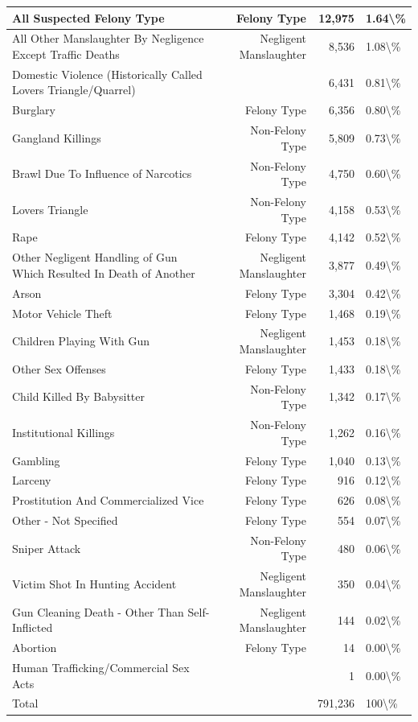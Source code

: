 \documentclass[
]{krantz}
\begin{document}
\begin{longtable}[t]{l|r|r|l}
\hline
All Suspected Felony Type & Felony Type & 12,975 & 1.64\textbackslash{}\%\\
\hline
All Other Manslaughter By Negligence Except Traffic Deaths & Negligent Manslaughter & 8,536 & 1.08\textbackslash{}\%\\
\hline
Domestic Violence (Historically Called Lovers Triangle/Quarrel) &  & 6,431 & 0.81\textbackslash{}\%\\
\hline
Burglary & Felony Type & 6,356 & 0.80\textbackslash{}\%\\
\hline
Gangland Killings & Non-Felony Type & 5,809 & 0.73\textbackslash{}\%\\
\hline
Brawl Due To Influence of Narcotics & Non-Felony Type & 4,750 & 0.60\textbackslash{}\%\\
\hline
Lovers Triangle & Non-Felony Type & 4,158 & 0.53\textbackslash{}\%\\
\hline
Rape & Felony Type & 4,142 & 0.52\textbackslash{}\%\\
\hline
Other Negligent Handling of Gun Which Resulted In Death of Another & Negligent Manslaughter & 3,877 & 0.49\textbackslash{}\%\\
\hline
Arson & Felony Type & 3,304 & 0.42\textbackslash{}\%\\
\hline
Motor Vehicle Theft & Felony Type & 1,468 & 0.19\textbackslash{}\%\\
\hline
Children Playing With Gun & Negligent Manslaughter & 1,453 & 0.18\textbackslash{}\%\\
\hline
Other Sex Offenses & Felony Type & 1,433 & 0.18\textbackslash{}\%\\
\hline
Child Killed By Babysitter & Non-Felony Type & 1,342 & 0.17\textbackslash{}\%\\
\hline
Institutional Killings & Non-Felony Type & 1,262 & 0.16\textbackslash{}\%\\
\hline
Gambling & Felony Type & 1,040 & 0.13\textbackslash{}\%\\
\hline
Larceny & Felony Type & 916 & 0.12\textbackslash{}\%\\
\hline
Prostitution And Commercialized Vice & Felony Type & 626 & 0.08\textbackslash{}\%\\
\hline
Other - Not Specified & Felony Type & 554 & 0.07\textbackslash{}\%\\
\hline
Sniper Attack & Non-Felony Type & 480 & 0.06\textbackslash{}\%\\
\hline
Victim Shot In Hunting Accident & Negligent Manslaughter & 350 & 0.04\textbackslash{}\%\\
\hline
Gun Cleaning Death - Other Than Self-Inflicted & Negligent Manslaughter & 144 & 0.02\textbackslash{}\%\\
\hline
Abortion & Felony Type & 14 & 0.00\textbackslash{}\%\\
\hline
Human Trafficking/Commercial Sex Acts &  & 1 & 0.00\textbackslash{}\%\\
\hline
Total &  & 791,236 & 100\textbackslash{}\%\\
\hline
\end{longtable}
\end{document}
